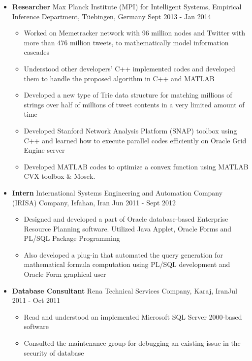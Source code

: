 \documentclass[letter]{res}
\begin{document}
\begin{resume}
\begin{itemize}[leftmargin=-.1in]
			\item \textbf{Researcher} \newline
			Max Planck Institute (MPI) for Intelligent Systems, Empirical Inference Department, Tüebingen, Germany \hfill {\footnotesize Sept 2013 - Jan 2014}\\
			\vspace{-4mm}
			\iflong
			\begin{itemize}
				\item Worked on Memetracker network with 96 million nodes and Twitter with more than 476 million tweets, to mathematically model information cascades
				\item Understood other developers' C++ implemented codes and developed them to handle the proposed algorithm in C++ and MATLAB
				\item Developed a new type of Trie data structure for matching millions of strings over half of millions of tweet contents in a very limited amount of time
				\item Developed Stanford Network Analysis Platform (SNAP) toolbox using C++ and learned how to execute parallel codes efficiently on Oracle Grid Engine server
				\item Developed MATLAB codes to optimize a convex function using MATLAB CVX toolbox \& Mosek.
			\end{itemize}
			\fi
			
			\item \textbf{Intern} \newline
			International Systems Engineering and Automation Company (IRISA) Company, Isfahan, Iran \hfill Jun 2011 - Sept 2012\\
			\vspace{-4mm}
			\iflong
			\begin{itemize}
				\item Designed and developed a part of Oracle database-based Enterprise Resource Planning software. Utilized Java Applet, Oracle Forms and PL/SQL Package Programming
				\item Also developed a plug-in that automated the query generation for mathematical formula computation using PL/SQL development and Oracle Form graphical user
			\end{itemize}
			\fi
			
			\item \textbf{Database Consultant}
			\newline
			Rena Technical Services Company, Karaj, Iran\hfill Jul 2011 - Oct 2011\\
			\vspace{-4mm}
			\iflong
			\begin{itemize}
				\item Read and understood an implemented Microsoft SQL Server 2000-based software
				\item Consulted the maintenance group for debugging an existing issue in the security of database
			\end{itemize}
		\end{itemize}
		

\end{resume}
\end{document}
